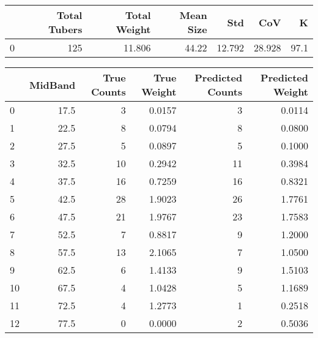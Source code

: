 \begin{tabular}{lrrrrrr}
\toprule
{} &  Total Tubers &  Total Weight &  Mean Size &     Std &     CoV &     K \\
\midrule
0 &           125 &        11.806 &      44.22 &  12.792 &  28.928 &  97.1 \\
\bottomrule
\end{tabular}

\begin{tabular}{lrrrrr}
\toprule
{} &  MidBand &  True Counts &  True Weight &  Predicted Counts &  Predicted Weight \\
\midrule
0  &     17.5 &            3 &       0.0157 &                 3 &            0.0114 \\
1  &     22.5 &            8 &       0.0794 &                 8 &            0.0800 \\
2  &     27.5 &            5 &       0.0897 &                 5 &            0.1000 \\
3  &     32.5 &           10 &       0.2942 &                11 &            0.3984 \\
4  &     37.5 &           16 &       0.7259 &                16 &            0.8321 \\
5  &     42.5 &           28 &       1.9023 &                26 &            1.7761 \\
6  &     47.5 &           21 &       1.9767 &                23 &            1.7583 \\
7  &     52.5 &            7 &       0.8817 &                 9 &            1.2000 \\
8  &     57.5 &           13 &       2.1065 &                 7 &            1.0500 \\
9  &     62.5 &            6 &       1.4133 &                 9 &            1.5103 \\
10 &     67.5 &            4 &       1.0428 &                 5 &            1.1689 \\
11 &     72.5 &            4 &       1.2773 &                 1 &            0.2518 \\
12 &     77.5 &            0 &       0.0000 &                 2 &            0.5036 \\
\bottomrule
\end{tabular}

